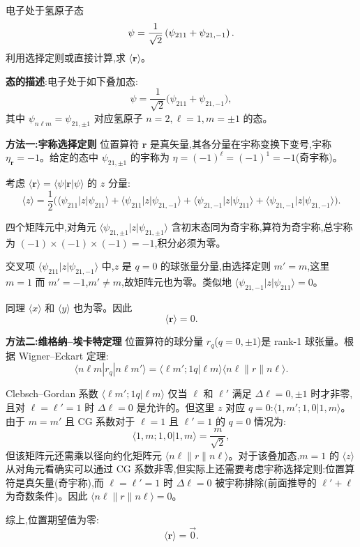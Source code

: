 \begin{question}
电子处于氢原子态
\[
\psi={1\over\sqrt2}\left(\psi_{211}+\psi_{21,-1}\right).
\]
利用选择定则或直接计算,求 $\langle\mathbf r\rangle$。
\begin{solution}
	\textbf{态的描述}:电子处于如下叠加态:
	\[
	\psi = \frac{1}{\sqrt{2}}\big(\psi_{211}+\psi_{21,-1}\big),
	\]
	其中 $\psi_{n\ell m}=\psi_{21,\pm1}$ 对应氢原子 $n=2,\ell=1,m=\pm1$ 的态。

	\textbf{方法一:宇称选择定则} 位置算符 $\mathbf r$ 是真矢量,其各分量在宇称变换下变号,宇称 $\eta_\mathbf r=-1$。给定的态中 $\psi_{21,\pm1}$ 的宇称为 $\eta=(-1)^\ell=(-1)^1=-1$(奇宇称)。

	考虑 $\langle \mathbf r\rangle = \langle \psi|\mathbf r|\psi\rangle$ 的 $z$ 分量:
	\[
	\langle z\rangle = \frac12\big(\langle\psi_{211}|z|\psi_{211}\rangle
	+ \langle\psi_{211}|z|\psi_{21,-1}\rangle
	+ \langle\psi_{21,-1}|z|\psi_{211}\rangle
	+ \langle\psi_{21,-1}|z|\psi_{21,-1}\rangle\big).
	\]

	四个矩阵元中,对角元 $\langle\psi_{21,\pm1}|z|\psi_{21,\pm1}\rangle$ 含初末态同为奇宇称,算符为奇宇称,总宇称为 $(-1)\times(-1)\times(-1) = -1$,积分必须为零。

	交叉项 $\langle\psi_{211}|z|\psi_{21,-1}\rangle$ 中,$z$ 是 $q=0$ 的球张量分量,由选择定则 $m'=m$,这里 $m=1$ 而 $m'=-1$,$m'\neq m$,故矩阵元也为零。类似地 $\langle\psi_{21,-1}|z|\psi_{211}\rangle=0$。

	同理 $\langle x\rangle$ 和 $\langle y\rangle$ 也为零。因此
	\[
	\boxed{\langle \mathbf r\rangle = 0}.
	\]

	\textbf{方法二:维格纳--埃卡特定理} 位置算符的球分量 $r_q$($q=0,\pm1$)是 rank-1 球张量。根据 Wigner--Eckart 定理:
	\[
	\langle n\ell m|r_q|n\ell m'\rangle = \langle \ell m';1q|\ell m\rangle\langle n\ell\|r\|n\ell\rangle.
	\]

	Clebsch--Gordan 系数 $\langle \ell m';1q|\ell m\rangle$ 仅当 $\ell$ 和 $\ell'$ 满足 $\Delta\ell=0,\pm1$ 时才非零,且对 $\ell=\ell'=1$ 时 $\Delta\ell=0$ 是允许的。但这里 $z$ 对应 $q=0$:$\langle 1,m';1,0|1,m\rangle$。由于 $m=m'$ 且 CG 系数对于 $\ell=1$ 且 $\ell'=1$ 的 $q=0$ 情况为:
	\[
	\langle 1,m;1,0|1,m\rangle = \frac{m}{\sqrt{2}},
	\]
	但该矩阵元还需乘以径向约化矩阵元 $\langle n\ell\|r\|n\ell\rangle$。对于该叠加态,$m=1$ 的 $\langle z\rangle$ 从对角元看确实可以通过 CG 系数非零,但实际上还需要考虑宇称选择定则:位置算符是真矢量(奇宇称),而 $\ell=\ell'=1$ 时 $\Delta\ell=0$ 被宇称排除(前面推导的 $\ell'+\ell$ 为奇数条件)。因此 $\langle n\ell\|r\|n\ell\rangle = 0$。

	综上,位置期望值为零:
	\[
	\boxed{\langle \mathbf r\rangle = \vec 0}.
	\]
	\end{solution}
\end{question}

